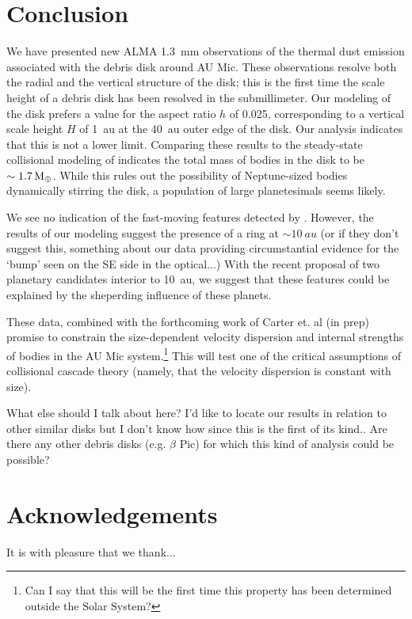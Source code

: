 \documentclass[12pt,oneside]{article}
\begin{document}
\section{Conclusion}
\label{section: conclusion}

We have presented new ALMA \SI{1.3}{mm} observations of the thermal dust emission associated with the debris disk around AU Mic. 
These observations resolve both the radial and the vertical structure of the disk; this is the first time the scale height of a debris disk has been resolved in the submillimeter.
Our modeling of the disk prefers a value for the aspect ratio $h$ of 0.025, corresponding to a vertical scale height $H$ of \SI{1}{au} at the \SI{40}{au} outer edge of the disk.
Our analysis indicates that this is not a lower limit.
Comparing these results to the steady-state collisional modeling of \cite{pan&schlichting12} indicates the total mass of bodies in the disk to be $\sim \SI{1.7}{M_\oplus}$.
While this rules out the possibility of Neptune-sized bodies dynamically stirring the disk, a population of large planetesimals seems likely.

We see no indication of the fast-moving features detected by \cite{boccaletti15}. However, the results of our modeling suggest the presence of a ring at $\sim \SI{10}{au}$ (or if they don't suggest this, something about our data providing circumstantial evidence for the `bump' seen on the SE side in the optical...) With the recent proposal of two planetary candidates interior to \SI{10}{au}, we suggest that these features could be explained by the sheperding influence of these planets. 

These data, combined with the forthcoming work of Carter et. al (in prep) promise to constrain the size-dependent velocity dispersion and internal strengths of bodies in the AU Mic system.\footnote{Can I say that this will be the first time this property has been determined outside the Solar System?} 
This will test one of the critical assumptions of collisional cascade theory (namely, that the velocity dispersion is constant with size).

What else should I talk about here? I'd like to locate our results in relation to other similar disks but I don't know how since this is the first of its kind.. Are there any other debris disks (e.g. $\beta$ Pic) for which this kind of analysis could be possible?

\section*{Acknowledgements}
It is with pleasure that we thank...
\clearpage

\end{document}
